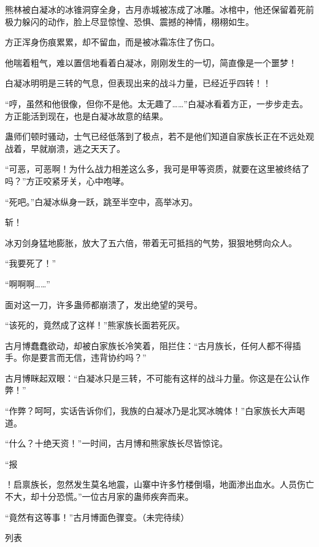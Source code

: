 \begin{this_body}
熊林被白凝冰的冰锥洞穿全身，古月赤城被冻成了冰雕。冰棺中，他还保留着死前极力躲闪的动作，脸上尽显惊惶、恐惧、震撼的神情，栩栩如生。

方正浑身伤痕累累，却不留血，而是被冰霜冻住了伤口。

他喘着粗气，难以置信地看着白凝冰，刚刚发生的一切，简直像是一个噩梦！

白凝冰明明是三转的气息，但表现出来的战斗力量，已经近乎四转！！

“哼，虽然和他很像，但你不是他。太无趣了……”白凝冰看着方正，一步步走去。方正能活到现在，也是白凝冰故意的结果。

蛊师们顿时骚动，士气已经低落到了极点，若不是他们知道自家族长正在不远处观战着，早就崩溃，逃之天天了。

“可恶，可恶啊！为什么战力相差这么多，我可是甲等资质，就要在这里被终结了吗？”方正咬紧牙关，心中咆哮。

“死吧。”白凝冰纵身一跃，跳至半空中，高举冰刃。

斩！

冰刃剑身猛地膨胀，放大了五六倍，带着无可抵挡的气势，狠狠地劈向众人。

“我要死了！”

“啊啊啊……”

面对这一刀，许多蛊师都崩溃了，发出绝望的哭号。

“该死的，竟然成了这样！”熊家族长面若死灰。

古月博蠢蠢欲动，却被白家族长冷笑着，阻拦住：“古月族长，任何人都不得插手。你是要言而无信，违背协约吗？”

古月博眯起双眼：“白凝冰只是三转，不可能有这样的战斗力量。你这是在公认作弊！”

“作弊？呵呵，实话告诉你们，我族的白凝冰乃是北冥冰魄体！”白家族长大声喝道。

“什么？十绝天资！”一时间，古月博和熊家族长尽皆惊诧。

“报

！启禀族长，忽然发生莫名地震，山寨中许多竹楼倒塌，地面渗出血水。人员伤亡不大，却十分恐慌。”一位古月家的蛊师疾奔而来。

“竟然有这等事！”古月博面色骤变。（未完待续）

列表

\end{this_body}

